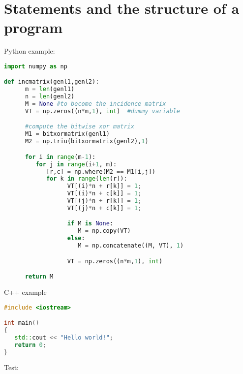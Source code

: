\documentclass[../main.tex]{subfiles}
\begin{document}
\section{Statements and the structure of a program}

Python example:

\begin{lstlisting}[language=Python, caption=Python example]
import numpy as np

def incmatrix(genl1,genl2):
      m = len(genl1)
      n = len(genl2)
      M = None #to become the incidence matrix
      VT = np.zeros((n*m,1), int)  #dummy variable

      #compute the bitwise xor matrix
      M1 = bitxormatrix(genl1)
      M2 = np.triu(bitxormatrix(genl2),1)

      for i in range(m-1):
         for j in range(i+1, m):
            [r,c] = np.where(M2 == M1[i,j])
            for k in range(len(r)):
                  VT[(i)*n + r[k]] = 1;
                  VT[(i)*n + c[k]] = 1;
                  VT[(j)*n + r[k]] = 1;
                  VT[(j)*n + c[k]] = 1;

                  if M is None:
                     M = np.copy(VT)
                  else:
                     M = np.concatenate((M, VT), 1)

                  VT = np.zeros((n*m,1), int)

      return M
\end{lstlisting}

\noindent C++ example

\begin{lstlisting}[language=C++, caption=C++ example]
#include <iostream>

int main()
{
   std::cout << "Hello world!";
   return 0;
}
\end{lstlisting}


Test: 
\end{document}
